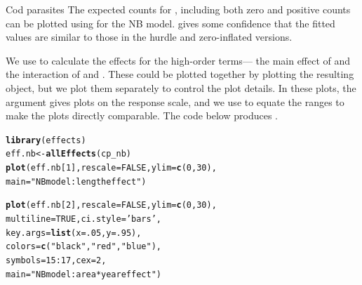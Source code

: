 \documentclass[11pt]{book}\usepackage[]{graphicx}\usepackage[]{color}
\makeatletter
\newcommand{\hlnum}[1]{\textcolor[rgb]{0.686,0.059,0.569}{#1}}%
\newcommand{\hlstr}[1]{\textcolor[rgb]{0.192,0.494,0.8}{#1}}%
\newcommand{\hlopt}[1]{\textcolor[rgb]{0,0,0}{#1}}%
\newcommand{\hlstd}[1]{\textcolor[rgb]{0.345,0.345,0.345}{#1}}%
\newcommand{\hlkwb}[1]{\textcolor[rgb]{0.69,0.353,0.396}{#1}}%
\newcommand{\hlkwc}[1]{\textcolor[rgb]{0.333,0.667,0.333}{#1}}%
\newcommand{\hlkwd}[1]{\textcolor[rgb]{0.737,0.353,0.396}{\textbf{#1}}}%
\newenvironment{kframe}{%
 \def\at@end@of@kframe{}%
 \ifinner\ifhmode%
  \def\at@end@of@kframe{\end{minipage}}%
  \begin{minipage}{\columnwidth}%
 \fi\fi%
 \def\FrameCommand##1{\hskip\@totalleftmargin \hskip-\fboxsep
 \colorbox{shadecolor}{##1}\hskip-\fboxsep
     \hskip-\linewidth \hskip-\@totalleftmargin \hskip\columnwidth}%
 \MakeFramed {\advance\hsize-\width
   \@totalleftmargin\z@ \linewidth\hsize
   \@setminipage}}%
 {\par\unskip\endMakeFramed%
 \at@end@of@kframe}
\newenvironment{knitrout}{}{} %
\renewenvironment{knitrout}{\small\renewcommand{\baselinestretch}{.85}}{} %
\makeatother
\begin{document}
\begin{Example}[cod3]{Cod parasites}
The expected counts for , including both zero and positive counts
can be plotted using  for the  NB model.
 gives some confidence that the fitted values
are similar to those in the hurdle and zero-inflated versions.

We use  to calculate the effects for the high-order terms--- the
main effect of  and the interaction of  and .
These could be plotted together by plotting the resulting  object,
but we plot them separately to control the plot details.  In these plots,
the argument  gives plots on the response scale, and
we use  to equate the ranges to make the plots directly comparable.
The code below produces .

\begin{knitrout}
\color{fgcolor}\begin{kframe}
\begin{alltt}
\hlkwd{library}\hlstd{(effects)}
\hlstd{eff.nb} \hlkwb{<-} \hlkwd{allEffects}\hlstd{(cp_nb)}
\hlkwd{plot}\hlstd{(eff.nb[}\hlnum{1}\hlstd{],} \hlkwc{rescale}\hlstd{=}\hlnum{FALSE}\hlstd{,} \hlkwc{ylim}\hlstd{=}\hlkwd{c}\hlstd{(}\hlnum{0}\hlstd{,}\hlnum{30}\hlstd{),}
     \hlkwc{main}\hlstd{=}\hlstr{"NB model: length effect"}\hlstd{)}

\hlkwd{plot}\hlstd{(eff.nb[}\hlnum{2}\hlstd{],} \hlkwc{rescale}\hlstd{=}\hlnum{FALSE}\hlstd{,} \hlkwc{ylim}\hlstd{=}\hlkwd{c}\hlstd{(}\hlnum{0}\hlstd{,}\hlnum{30}\hlstd{),}
     \hlkwc{multiline}\hlstd{=}\hlnum{TRUE}\hlstd{,} \hlkwc{ci.style}\hlstd{=}\hlstr{'bars'}\hlstd{,}
     \hlkwc{key.args}\hlstd{=}\hlkwd{list}\hlstd{(}\hlkwc{x}\hlstd{=}\hlnum{.05}\hlstd{,} \hlkwc{y}\hlstd{=}\hlnum{.95}\hlstd{),}
     \hlkwc{colors}\hlstd{=}\hlkwd{c}\hlstd{(}\hlstr{"black"}\hlstd{,} \hlstr{"red"}\hlstd{,} \hlstr{"blue"}\hlstd{) ,}
     \hlkwc{symbols}\hlstd{=}\hlnum{15}\hlopt{:}\hlnum{17}\hlstd{,} \hlkwc{cex}\hlstd{=}\hlnum{2}\hlstd{,}
     \hlkwc{main}\hlstd{=}\hlstr{"NB model: area*year effect"}\hlstd{)}
\end{alltt}
\end{kframe}\begin{figure}[!htbp]



\end{figure}
\end{knitrout}
\end{Example}
\end{document}
